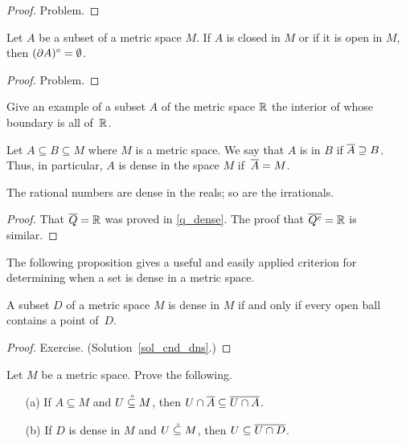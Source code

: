 \begin{proof} Problem. \ns  \end{proof}

\begin{prop}  Let $A$ be a subset of a metric space $M$. If $A$ is closed in $M$ or if it is
open in $M$, then $(\partial A)^{\circ} = \emptyset$.
\end{prop}

\begin{proof} Problem. \ns  \end{proof}

\begin{prob} Give an example of a subset $A$ of the metric space $\mathbb{R}$ the interior of whose
boundary is all of~$\mathbb{R}$.
\end{prob}

\begin{defn} Let $A \subseteq B \subseteq M$ where $M$ is a metric space. We say that $A$ is
 in $B$ if $\overline{A} \supseteq B$.  Thus, in particular, $A$ is dense in the space $M$
if~$\overline{A} = M$.
\end{defn}

\begin{exam} The rational numbers are dense in the reals; so are the irrationals.
\end{exam}

\begin{proof} That $\overline{Q} = \mathbb{R}$ was proved in \ref{q_dense}.  The proof that $\overline{Q^c} = \mathbb{R}$
is similar.
\end{proof}

The following proposition gives a useful and easily applied criterion for determining when a
set is dense in a metric space.

\begin{prop}\label{cnd_dns} A subset $D$ of a metric space $M$ is dense in $M$ if and only if
every open ball contains a point of~$D$.
\end{prop}

\begin{proof} Exercise.  (Solution~\ref{sol_cnd_dns}.)
  \ns \end{proof}

\begin{prob}  Let $M$ be a metric space.  Prove the following.
 \begin{enumerate}
  \item[(a)] If $A \subseteq M$ and $U\overset{\thickspace{}_\circ}{\subseteq}M$, then $U \cap \overline{A} \subseteq \overline{U \cap A}$.
  \item[(b)] If $D$ is dense in $M$ and $U\overset{\thickspace{}_\circ}{\subseteq}M$, then $U \subseteq \overline{U \cap D}$.
 \end{enumerate}
\end{prob}


